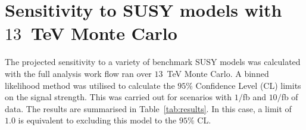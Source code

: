 
\section{Sensitivity to SUSY models with $13$~TeV Monte Carlo}
\label{sec:phys14Results}

The projected sensitivity to a variety of benchmark SUSY models was calculated with the full analysis work flow ran over $13$~TeV Monte Carlo. A binned likelihood method was utilised to calculate the $95\%$ Confidence Level (CL) limits on the signal strength. This was carried out for scenarios with $1/$fb and $10/$fb of data. The results are summarised in Table~\ref{tab:results}. In this case, a limit of $1.0$ is equivalent to excluding this model to the $95\%$ CL.
